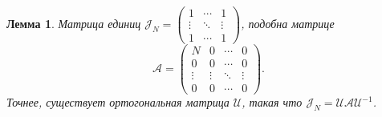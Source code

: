 \documentclass[14pt,a4paper]{extarticle}
\newtheorem{lem}{Лемма}
\theoremstyle{definition}
\begin{document}
\begin{lem}
    Матрица единиц 
    \( \mathcal{J}_N =
    \begin{pmatrix}
        1 & \cdots & 1 \\
        \vdots & \ddots & \vdots \\ 
    1 & \cdots & 1 \end{pmatrix} \),
    подобна матрице
    \[
        \mathcal{A} = \begin{pmatrix}
            N & 0 & \cdots & 0 \\
            0 & 0 & \cdots & 0 \\
            \vdots & \vdots & \ddots & \vdots \\
            0 & 0 & \cdots & 0 \end{pmatrix}. \]
    Точнее, существует ортогональная матрица \( \mathcal{U} \),
    такая что
    \( \mathcal{J}_N = \mathcal{U}\mathcal{A} \mathcal{U}^{-1} \).
\end{lem}
\end{document}
